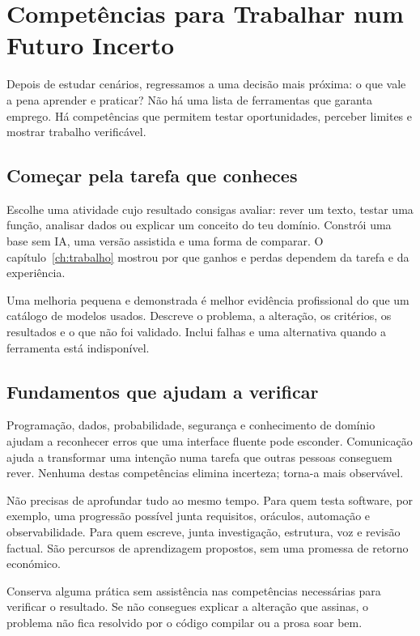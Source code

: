 \chapter{Competências para Trabalhar num Futuro Incerto}
\label{ch:futuro}

Depois de estudar cenários, regressamos a uma decisão mais próxima: o que vale a pena aprender e praticar? Não há uma lista de ferramentas que garanta emprego. Há competências que permitem testar oportunidades, perceber limites e mostrar trabalho verificável.

\section{Começar pela tarefa que conheces}
Escolhe uma atividade cujo resultado consigas avaliar: rever um texto, testar uma função, analisar dados ou explicar um conceito do teu domínio. Constrói uma base sem IA, uma versão assistida e uma forma de comparar. O capítulo~\ref{ch:trabalho} mostrou por que ganhos e perdas dependem da tarefa e da experiência.

Uma melhoria pequena e demonstrada é melhor evidência profissional do que um catálogo de modelos usados. Descreve o problema, a alteração, os critérios, os resultados e o que não foi validado. Inclui falhas e uma alternativa quando a ferramenta está indisponível.

\section{Fundamentos que ajudam a verificar}
Programação, dados, probabilidade, segurança e conhecimento de domínio ajudam a reconhecer erros que uma interface fluente pode esconder. Comunicação ajuda a transformar uma intenção numa tarefa que outras pessoas conseguem rever. Nenhuma destas competências elimina incerteza; torna-a mais observável.

Não precisas de aprofundar tudo ao mesmo tempo. Para quem testa software, por exemplo, uma progressão possível junta requisitos, oráculos, automação e observabilidade. Para quem escreve, junta investigação, estrutura, voz e revisão factual. São percursos de aprendizagem propostos, sem uma promessa de retorno económico.

Conserva alguma prática sem assistência nas competências necessárias para verificar o resultado. Se não consegues explicar a alteração que assinas, o problema não fica resolvido por o código compilar ou a prosa soar bem.

